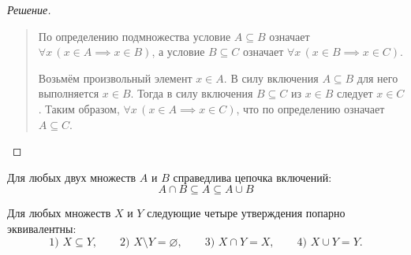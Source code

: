 \begin{proof}[Решение]~\\
    \begin{quote}
        По определению подмножества условие $A \subseteq B$ означает 
        $\forall x \, (x \in A \implies x \in B)$, а условие $B \subseteq C$ 
        означает $\forall x \, (x \in B \implies x \in C)$.

        Возьмём произвольный элемент $x \in A$. В силу включения 
        $A \subseteq B$ для него выполняется $x \in B$. Тогда в силу 
        включения $B \subseteq C$ из $x \in B$ следует $x \in C$. 
        Таким образом, $\forall x \, (x \in A \implies x \in C)$, что по 
        определению означает $A \subseteq C$.
    \end{quote}
\end{proof}

\begin{remark}
    Для любых двух множеств $A$ и $B$ справедлива цепочка включений:
    \begin{equation} \label{eq:cap_cup_sub}
        A \cap B \subseteq A \subseteq A \cup B \tag{5}
    \end{equation}
\end{remark}

\begin{proposition}
    Для любых множеств $X$ и $Y$ следующие четыре утверждения попарно 
    эквивалентны:
    \[
        \text{1) } X \subseteq Y, \qquad
        \text{2) } X \setminus Y = \varnothing, \qquad
        \text{3) } X \cap Y = X, \qquad
        \text{4) } X \cup Y = Y.
    \]
\end{proposition}

